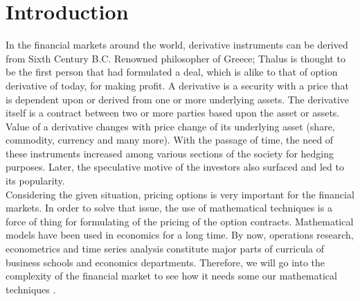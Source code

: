 \chapter{Introduction}
\label{ch:Introduction}

	In the financial markets around the world, derivative instruments can be derived from Sixth Century B.C. Renowned philosopher of Greece; Thalus is thought to be the first person that had formulated a deal, which is alike to that of option derivative of today, for making profit.
A derivative is a security with a price that is dependent upon or derived from one or more underlying assets.
The derivative itself is a contract between two or more parties based upon the asset or assets.
 Value of a derivative changes with price change of its underlying asset (share, commodity, currency and many more). With the passage of time, the need of these instruments increased among various sections of the society for hedging purposes. Later, the speculative motive of the investors also surfaced and led to its popularity.\\[0.5cm]
Considering the given situation, pricing options is very important for the financial markets. In order to solve that issue, the use of mathematical techniques is a force of thing for formulating of the pricing of the option contracts. Mathematical models have been used in economics for a long time. By now, operations research, econometrics and time series analysis constitute major parts of curricula of business schools and economics departments.
Therefore, we will go into the complexity of the financial market to see how it needs some our  mathematical techniques .

